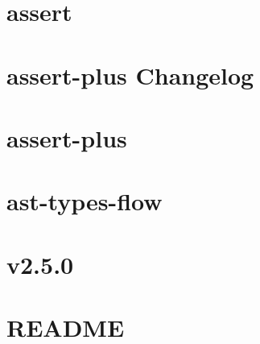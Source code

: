 \documentclass[twoside]{book}
\newcommand{\+}{\discretionary{\mbox{\scriptsize$\hookleftarrow$}}{}{}}
\begin{document}
\chapter{assert}
\label{md__c_1_workspace_demo_src_main_script_node_modules_assert__r_e_a_d_m_e}

\chapter{assert-\/plus Changelog}
\label{md__c_1_workspace_demo_src_main_script_node_modules_assert-plus__c_h_a_n_g_e_s}

\chapter{assert-\/plus}
\label{md__c_1_workspace_demo_src_main_script_node_modules_assert-plus__r_e_a_d_m_e}

\chapter{ast-\/types-\/flow}
\label{md__c_1_workspace_demo_src_main_script_node_modules_ast-types-flow__r_e_a_d_m_e}

\chapter{v2.5.0}
\label{md__c_1_workspace_demo_src_main_script_node_modules_async__c_h_a_n_g_e_l_o_g}

\chapter{R\+E\+A\+D\+ME}
\label{md__c_1_workspace_demo_src_main_script_node_modules_async__r_e_a_d_m_e}

\end{document}
